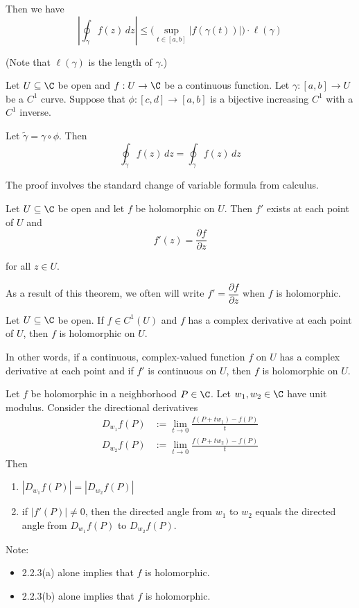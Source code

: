 Then we have
$$
	\left|\oint_\gamma f(z)\,dz\right|\leq
	\Big(\sup_{t\in[a,b]}|f(\gamma(t))|\Big)\cdot\ell(\gamma)
$$

(Note that $\ell(\gamma)$ is the length of $\gamma$.)


Let $U\subseteq\C$ be open and $f:U\to\C$ be a continuous function.
Let $\gamma:[a,b]\to U$ be a $C^1$ curve. Suppose that
$\phi:[c,d]\to[a,b]$ is a bijective increasing $C^1$ with a $C^1$
inverse.


Let $\tilde\gamma=\gamma\circ\phi$. Then
$$\oint_{\tilde\gamma}f(z)\,dz=\oint_\gamma f(z)\,dz$$

The proof involves the standard change of variable formula from
calculus.

\label{f75e43c}

Let $U\subseteq\C$ be open and let $f$ be holomorphic on $U$. Then
$f'$ exists at each point of $U$ and
$$f'(z)=\frac{\partial f}{\partial z}$$

for all $z\in U$.

As a result of this theorem, we often will write $f'=\dfrac{\partial
		f}{\partial z}$ when $f$ is holomorphic.


Let $U\subseteq\C$ be open. If $f\in C^1(U)$ and $f$ has a complex
derivative at each point of $U$, then $f$ is holomorphic on $U$.

In other words, if a continuous, complex-valued function $f$ on $U$ has
a complex derivative at each point and if $f'$ is continuous on $U$,
then $f$ is holomorphic on $U$.


Let $f$ be holomorphic in a neighborhood $P\in\C$. Let $w_1,w_2\in\C$
have unit modulus. Consider the directional derivatives
\begin{align*}
	D_{w_1}f(P) & :=\lim_{t\to0}\frac{f(P+tw_1)-f(P)}t \\
	D_{w_2}f(P) & :=\lim_{t\to0}\frac{f(P+tw_2)-f(P)}t
\end{align*}
Then
\begin{enumerate}[label=(\alph*)]
	\item $|D_{w_1}f(P)|=|D_{w_2}f(P)|$
	\item if $|f'(P)|\neq0$, then the directed angle from $w_1$ to
	      $w_2$ equals the directed angle from $D_{w_1}f(P)$ to $D_{w_2}f(P)$.
\end{enumerate}
Note:
\begin{itemize}
	\item 2.2.3(a) alone implies that $f$ is holomorphic.
	\item 2.2.3(b) alone implies that $f$ is holomorphic.
\end{itemize}

